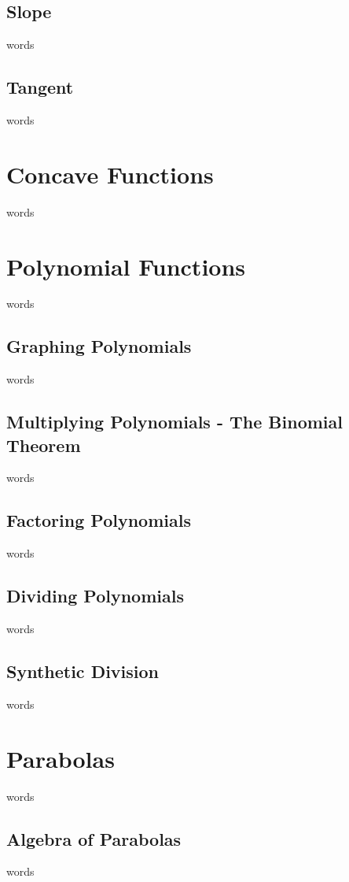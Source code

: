 \subsection{Slope}
words

\subsection{Tangent}
words


\section{Concave Functions}
words


\section{Polynomial Functions}
words

\subsection{Graphing Polynomials}
words

\subsection{Multiplying Polynomials - The Binomial Theorem}
words

\subsection{Factoring Polynomials}
words

\subsection{Dividing Polynomials}
words

\subsection{Synthetic Division}
words



\section{Parabolas}
words


\subsection{Algebra of Parabolas}
words

